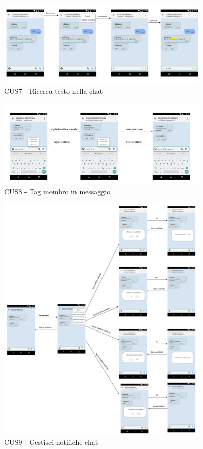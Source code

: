 \begin{figure}
	\centering
	\includegraphics[width=0.9\textwidth]{imgs/gruppo6/activities/act_cus7_ricerca_testo_nella_chat.pdf}
	\caption{CUS7 - Ricerca testo nella chat}
	\label{fig:act-cus7}
\end{figure}

\begin{figure}
	\centering
	\includegraphics[width=0.9\textwidth]{imgs/gruppo6/activities/act_cus8_tag_membro_messaggio.pdf}
	\caption{CUS8 - Tag membro in messaggio}
	\label{fig:act-cus8}
\end{figure}

\begin{figure}
	\centering
	\includegraphics[width=0.9\textwidth]{imgs/gruppo6/activities/act_cus9_gestisci_notifiche_chat.pdf}
	\caption{CUS9 - Gestisci notifiche chat}
	\label{fig:act-cus9}
\end{figure}

